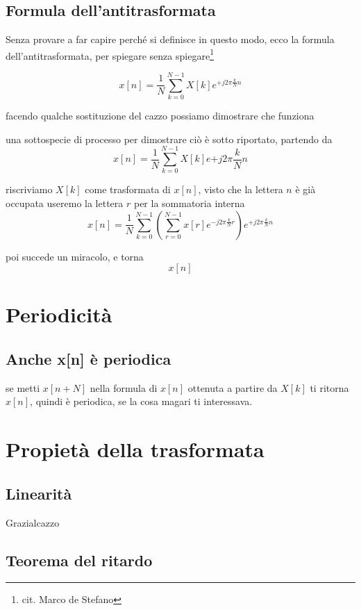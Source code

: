 \documentclass[11pt]{article}
\begin{document}
\subsection{Formula dell'antitrasformata}
\label{sec:org1153d81}

Senza provare a far capire perché si definisce in questo modo, ecco la
formula dell'antitrasformata, per spiegare senza
spiegare\footnote{cit. Marco de Stefano}

\[ x[n] = \frac{1}{N} \sum_{k=0}^{N-1} X[k] e^{+j2\pi \frac{k}{N}n} \]

facendo qualche sostituzione del cazzo possiamo dimostrare che
funziona

una sottospecie di processo per dimostrare ciò è sotto riportato,
partendo da
\[ x[n] = \frac{1}{N} \sum_{k=0}^{N-1} X[k] e{+j2\pi \frac{k}{N}n} \]

riscriviamo \(X[k]\) come trasformata di \(x[n]\), visto che la lettera
\(n\) è già occupata useremo la lettera \(r\) per la sommatoria interna
\[ x[n] = \frac{1}{N} \sum_{k=0}^{N-1}
(\sum_{r = 0}^{N-1} x[r] e^{-j 2\pi \frac{k}{N}r})
e^{+j2\pi \frac{k}{N}n} \]

poi succede un miracolo, e torna
\[ x[n] \]


\section{Periodicità}
\label{sec:org2a51363}

\subsection{Anche x[n] è periodica}
\label{sec:org67d464e}
se metti \(x[n + N]\) nella formula di \(x[n]\) ottenuta a partire da
\(X[k]\) ti ritorna \(x[n]\), quindi è periodica, se la cosa magari ti interessava.


\section{Propietà della trasformata}
\label{sec:org42dc8d2}

\subsection{Linearità}
\label{sec:org381e902}

Grazialcazzo

\subsection{Teorema del ritardo}
\label{sec:org464bb9a}
\end{document}
